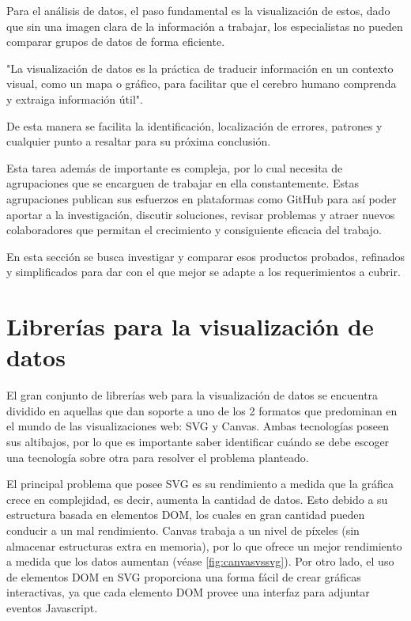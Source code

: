Para el análisis de datos, el paso fundamental es la visualización de estos, dado que sin una imagen clara de la información a trabajar, los especialistas no pueden comparar grupos de datos de forma eficiente. 

"La visualización de datos es la práctica de traducir información en un contexto visual, como un mapa o gráfico, para facilitar que el cerebro humano comprenda y extraiga información útil". \cite{DefinitionDataViz}

De esta manera se facilita la identificación, localización de errores, patrones y cualquier punto a resaltar para su próxima conclusión.

Esta tarea además de importante es compleja, por lo cual necesita de agrupaciones que se encarguen de trabajar en ella constantemente. Estas agrupaciones publican sus esfuerzos en plataformas como GitHub para así poder aportar a la investigación, discutir soluciones, revisar problemas y atraer nuevos colaboradores que permitan el crecimiento y consiguiente eficacia del trabajo.

En esta sección se busca investigar y comparar esos productos probados, refinados y simplificados para dar con el que mejor se adapte a los requerimientos a cubrir. 




\section{Librerías para la visualización de datos}

El gran conjunto de librerías web para la visualización de datos se encuentra dividido en aquellas que dan soporte a uno de los 2 formatos que predominan en el mundo de las visualizaciones web: SVG y Canvas. Ambas tecnologías poseen sus altibajos, por lo que es importante saber identificar cuándo se debe escoger una tecnología sobre otra para resolver el problema planteado. 

El principal problema que posee SVG es su rendimiento a medida que la gráfica crece en complejidad, es decir, aumenta la cantidad de datos. Esto debido a su estructura basada en elementos DOM, los cuales en gran cantidad pueden conducir a un mal rendimiento\cite{SVGPerformance}. Canvas trabaja a un nivel de píxeles (sin almacenar estructuras extra en memoria), por lo que ofrece un mejor rendimiento a medida que los datos aumentan (véase \ref{fig:canvasvssvg}). Por otro lado, el uso de elementos DOM en SVG proporciona una forma fácil de crear gráficas interactivas, ya que cada elemento DOM provee una interfaz para adjuntar eventos Javascript.

